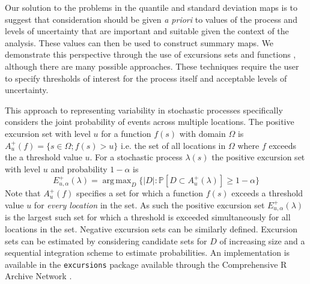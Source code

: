 \documentclass[preprint,12pt]{elsarticle}
\DeclareMathOperator*{\argmax}{arg\,max}  %
\begin{document}
Our solution to the problems in the quantile and standard deviation maps is to suggest that consideration should be given \emph{a priori} to values of the process and levels of uncertainty that are important and suitable given the context of the analysis.  These values can then be used to construct summary maps.  We demonstrate this perspective through the use of excursions sets and functions \citep{bolin_excursion_2015}, although there are many possible approaches.  These techniques require the user to specify thresholds of interest for the process itself and acceptable levels of uncertainty. 

This approach to representing variability in stochastic processes specifically considers the joint probability of events across multiple locations.  The positive excursion set with level $u$ for a function $f(s)$ with domain $\Omega$ is $A_u^{+}(f) = \{ s \in \Omega ; f(s) > u \}$ i.e. the set of all locations in $\Omega$ where $f$ exceeds the a threshold value $u$. For a stochastic process $\lambda(s)$ the positive excursion set with level $u$ and probability $1 - \alpha$ is
\begin{equation*}
E_{u,\alpha}^{+}(\lambda) = \argmax_{D}\{\lvert D \rvert : \mathbb{P}\left[D \subset A_u^{+}(\lambda)\right] \geq 1 - \alpha \}
\end{equation*}
Note that $A_u^{+}(f)$ specifies a set for which a function $f(s)$ exceeds a threshold value $u$ for \textit{every location} in the set.  As such the positive excursion set $E_{u,\alpha}^{+}(\lambda)$ is the largest such set for which a threshold is exceeded simultaneously for all locations in the set.  Negative excursion sets can be similarly defined.  Excursion sets can be estimated by considering candidate sets for $D$ of increasing size and a sequential integration scheme to estimate probabilities.  An implementation is available in the \texttt{excursions} package \citep{bolin_calculating_2018} available through the Comprehensive R Archive Network \citep{r_2017}.
\end{document}
